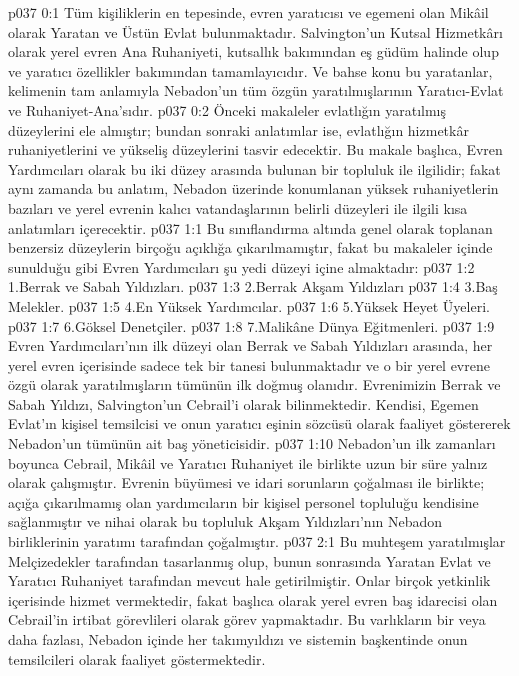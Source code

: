 \vs p037 0:1 Tüm kişiliklerin en tepesinde, evren yaratıcısı ve egemeni olan Mikâil olarak Yaratan ve Üstün Evlat bulunmaktadır. Salvington’un Kutsal Hizmetkârı olarak yerel evren Ana Ruhaniyeti, kutsallık bakımından eş güdüm halinde olup ve yaratıcı özellikler bakımından tamamlayıcıdır. Ve bahse konu bu yaratanlar, kelimenin tam anlamıyla Nebadon’un tüm özgün yaratılmışlarının Yaratıcı\hyp{}Evlat ve Ruhaniyet\hyp{}Ana’sıdır.
\vs p037 0:2 Önceki makaleler evlatlığın yaratılmış düzeylerini ele almıştır; bundan sonraki anlatımlar ise, evlatlığın hizmetkâr ruhaniyetlerini ve yükseliş düzeylerini tasvir edecektir. Bu makale başlıca, Evren Yardımcıları olarak bu iki düzey arasında bulunan bir topluluk ile ilgilidir; fakat aynı zamanda bu anlatım, Nebadon üzerinde konumlanan yüksek ruhaniyetlerin bazıları ve yerel evrenin kalıcı vatandaşlarının belirli düzeyleri ile ilgili kısa anlatımları içerecektir.
\vs p037 1:1 Bu sınıflandırma altında genel olarak toplanan benzersiz düzeylerin birçoğu açıklığa çıkarılmamıştır, fakat bu makaleler içinde sunulduğu gibi Evren Yardımcıları şu yedi düzeyi içine almaktadır:
\vs p037 1:2 1.\bibnobreakspace Berrak ve Sabah Yıldızları.
\vs p037 1:3 2.\bibnobreakspace Berrak Akşam Yıldızları
\vs p037 1:4 3.\bibnobreakspace Baş Melekler.
\vs p037 1:5 4.\bibnobreakspace En Yüksek Yardımcılar.
\vs p037 1:6 5.\bibnobreakspace Yüksek Heyet Üyeleri.
\vs p037 1:7 6.\bibnobreakspace Göksel Denetçiler.
\vs p037 1:8 7.\bibnobreakspace Malikâne Dünya Eğitmenleri.
\vs p037 1:9 Evren Yardımcıları’nın ilk düzeyi olan Berrak ve Sabah Yıldızları arasında, her yerel evren içerisinde sadece tek bir tanesi bulunmaktadır ve o bir yerel evrene özgü olarak yaratılmışların tümünün ilk doğmuş olanıdır. Evrenimizin Berrak ve Sabah Yıldızı, Salvington’un Cebrail’i olarak bilinmektedir. Kendisi, Egemen Evlat’ın kişisel temsilcisi ve onun yaratıcı eşinin sözcüsü olarak faaliyet göstererek Nebadon’un tümünün ait baş yöneticisidir.
\vs p037 1:10 Nebadon’un ilk zamanları boyunca Cebrail, Mikâil ve Yaratıcı Ruhaniyet ile birlikte uzun bir süre yalnız olarak çalışmıştır. Evrenin büyümesi ve idari sorunların çoğalması ile birlikte; açığa çıkarılmamış olan yardımcıların bir kişisel personel topluluğu kendisine sağlanmıştır ve nihai olarak bu topluluk Akşam Yıldızları’nın Nebadon birliklerinin yaratımı tarafından çoğalmıştır.
\vs p037 2:1 Bu muhteşem yaratılmışlar Melçizedekler tarafından tasarlanmış olup, bunun sonrasında Yaratan Evlat ve Yaratıcı Ruhaniyet tarafından mevcut hale getirilmiştir. Onlar birçok yetkinlik içerisinde hizmet vermektedir, fakat başlıca olarak yerel evren baş idarecisi olan Cebrail’in irtibat görevlileri olarak görev yapmaktadır. Bu varlıkların bir veya daha fazlası, Nebadon içinde her takımyıldızı ve sistemin başkentinde onun temsilcileri olarak faaliyet göstermektedir.
